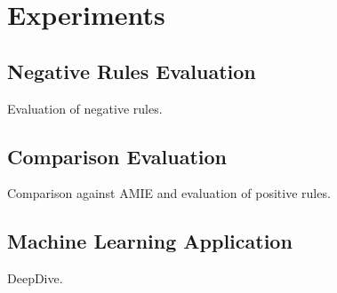 \section{Experiments}

\subsection{Negative Rules Evaluation}
Evaluation of negative rules.

\subsection{Comparison Evaluation}
Comparison against AMIE and evaluation of positive rules.

\subsection{Machine Learning Application}
DeepDive.